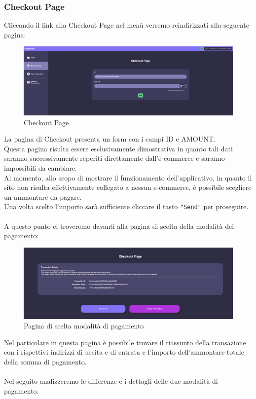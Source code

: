         \subsubsection{Checkout Page}
        Cliccando il link alla Checkout Page nel menù verremo reindirizzati alla seguente pagina:
        \begin{figure}[H]
            \centering
            \includegraphics[scale=0.2]{immagini/Checkout/Checkout.png}
            \caption{Checkout Page}
        \end{figure}
        La pagina di Checkout presenta un form con i campi ID e AMOUNT.\\
        Questa pagina risulta essere esclusivamente dimostrativa in quanto tali dati saranno successivamente reperiti direttamente dall'e-commerce\glo{} e saranno impossibili da cambiare.\\
        Al momento, allo scopo di mostrare il funzionamento dell'applicativo, in quanto il sito non risulta effettivamente collegato a nessun e-commerce\glo{}, è possibile scegliere un ammontare da pagare. \\
        Una volta scelto l'importo sarà sufficiente cliccare il tasto \texttt{"Send"} per proseguire.\\\\
        A questo punto ci troveremo davanti alla pagina di scelta della modalità del pagamento:
        \begin{figure}[H]
            \centering
            \includegraphics[scale=0.2]{immagini/Checkout/PaymentMode.png}
            \caption{Pagina di scelta modalità di pagamento}
        \end{figure}
        Nel particolare in questa pagina è possibile trovare il riassunto della transazione con i rispettivi indirizzi di uscita e di entrata e l'importo dell'ammontare totale della somma di pagamento.\\\\
        Nel seguito analizzeremo le differenze e i dettagli delle due modalità di pagamento.

